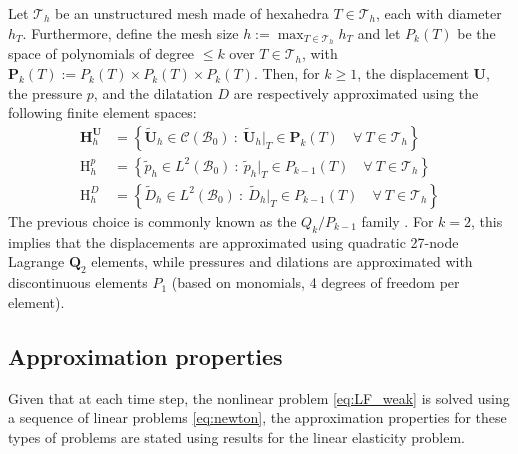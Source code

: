 \documentclass{sfuthesis}
\numberwithin{equation}{section}
\numberwithin{figure}{chapter}
\numberwithin{table}{chapter}
\theoremstyle{definition}
\def\*#1{{\mathbf{#1}}} %
\newcommand{\B}{\mathcal{B}}
\newcommand{\Hhu}{\mathbf{H}_h^{\*U}}
\newcommand{\Hhp}{\mathrm{H}_h^{p}}
\newcommand{\HhD}{\mathrm{H}_h^{D}}
\begin{document}
Let $\mathcal{T}_h$ be an unstructured mesh made of hexahedra $T \in \mathcal{T}_h$, each with diameter $h_T$. Furthermore, define the mesh size $h := \max_{T \in \mathcal{T}_h} h_T$ and let $P_k(T)$ be the space of polynomials of degree $\leq k$ over $T \in \mathcal{T}_h$, with $\*P_k(T) := P_k(T) \times P_k(T) \times P_k(T)$. Then, for $k \geq 1$, the displacement $\*U$, the pressure $p$, and the dilatation $D$ are respectively approximated using the following finite element spaces:
\begin{subequations} \label{eq:FE_spaces}
\begin{align}
    \label{eq:Hhu} \Hhu &= \left\{ \widetilde{\*U}_h \in \mathcal{C}(\B_0) \ : \ \widetilde{\*U}_h \Big|_T \in \*P_{k}(T) \quad \forall \ T \in \mathcal{T}_h \right\} \\
    \label{eq:Hhp} \Hhp &= \left\{ \widetilde{p}_h \in L^2(\B_0) \ : \ \widetilde{p}_h \Big|_T \in P_{k-1}(T) \quad \forall \ T \in \mathcal{T}_h \right\} \\
    \label{eq:Hhd} \HhD &= \left\{ \widetilde{D}_h \in L^2(\B_0) \ : \ \widetilde{D}_h \Big|_T \in P_{k-1}(T) \quad \forall \ T \in \mathcal{T}_h \right\}
\end{align}
\end{subequations}
The previous choice is commonly known as the $Q_k/P_{k-1}$ family \cite{BoffiBrezziFortin2013}. For $k=2$, this implies that the displacements are approximated using quadratic 27-node Lagrange $\*Q_2$ elements, while pressures and dilations are approximated with discontinuous elements $P_1$ (based on monomials, 4 degrees of freedom per element). 

\subsection{Approximation properties} \label{sec:FE_approximation_properties}

Given that at each time step, the nonlinear problem \eqref{eq:LF_weak} is solved using a sequence of linear problems \eqref{eq:newton}, the approximation properties for these types of problems are stated using results for the linear elasticity problem.
\end{document}

